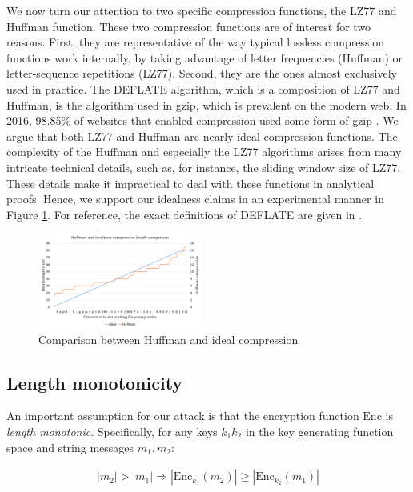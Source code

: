 \documentclass[conference, letterpaper, 10pt]{IEEEtran}
\begin{document}
We now turn our attention to two specific compression functions, the
LZ77 and Huffman function. These two compression functions are of
interest for two reasons. First, they are representative of the way
typical lossless compression functions work internally, by taking
advantage of letter frequencies (Huffman) or letter-sequence
repetitions (LZ77). Second, they are the ones almost exclusively used in
practice. The DEFLATE algorithm, which is a composition of LZ77 and
Huffman, is the algorithm used in gzip, which is prevalent on the
modern web. In 2016, 98.85\% of websites that enabled compression used
some form of gzip \cite{c19}. We argue that both LZ77 and Huffman are nearly
ideal compression functions. The complexity of the Huffman and
especially the LZ77 algorithms arises from many intricate technical
details, such as, for instance, the sliding window size of LZ77. These
details make it impractical to deal with these functions in analytical
proofs. Hence, we support our idealness claims in an experimental
manner in Figure \ref{fig:huffman_idealness}. For reference, the exact definitions of DEFLATE are given in
\cite{c12}.

    \begin{figure}[thpb]
        \centering
            \includegraphics[width=0.48\textwidth]{idealness_experiments/huffman_idealness.png}
        \caption{Comparison between Huffman and ideal compression}
        \label{fig:huffman_idealness}
    \end{figure}

\subsection{Length monotonicity}\label{subsec:lenmonotone}

An important assumption for our attack is that the encryption function
$\textrm{Enc}$ is \textit{length monotonic}. Specifically, for any keys $k_1
k_2$ in the key generating function space and string messages $m_1, m_2$:

\begin{equation*}
\begin{split}
|m_2| > |m_1|
\Rightarrow
|\textrm{Enc}_{k_1}(m_2)| \geq |\textrm{Enc}_{k_2}(m_1)|
\end{split}
\end{equation*}
\end{document}

